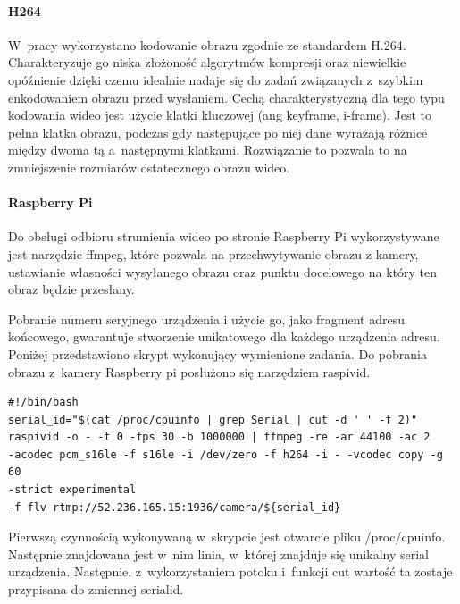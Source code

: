 \paragraph{H264}
W~pracy wykorzystano kodowanie obrazu zgodnie ze standardem H.264. Charakteryzuje go niska złożoność algorytmów kompresji oraz niewielkie opóźnienie dzięki czemu idealnie nadaje się do zadań związanych z~szybkim enkodowaniem obrazu przed wysłaniem. \cite{H264}
Cechą charakterystyczną dla tego typu kodowania wideo jest użycie klatki kluczowej (ang keyframe, i-frame). Jest to pełna klatka obrazu, podczas gdy następujące po niej dane wyrażają różnice między dwoma tą a~następnymi klatkami. Rozwiązanie to pozwala to na zmniejszenie rozmiarów ostatecznego obrazu wideo.

\paragraph{Raspberry Pi}
Do obsługi odbioru strumienia wideo po stronie Raspberry Pi wykorzystywane jest narzędzie ffmpeg, które pozwala na przechwytywanie obrazu z kamery, ustawianie własności wysyłanego obrazu oraz punktu docelowego na który ten obraz będzie przesłany.

Pobranie numeru seryjnego urządzenia i użycie go, jako fragment adresu końcowego, gwarantuje stworzenie unikatowego dla każdego urządzenia adresu. Poniżej przedstawiono skrypt wykonujący wymienione zadania. Do pobrania obrazu z~kamery Raspberry pi posłużono się narzędziem raspivid. \cite{raspivid}
\begin{verbatim}
#!/bin/bash
serial_id="$(cat /proc/cpuinfo | grep Serial | cut -d ' ' -f 2)"
raspivid -o - -t 0 -fps 30 -b 1000000 | ffmpeg -re -ar 44100 -ac 2 
-acodec pcm_s16le -f s16le -i /dev/zero -f h264 -i - -vcodec copy -g 60 
-strict experimental 
-f flv rtmp://52.236.165.15:1936/camera/${serial_id}
\end{verbatim}
Pierwszą czynnością wykonywaną w~skrypcie jest otwarcie pliku /proc/cpuinfo. Następnie znajdowana jest w~nim linia, w~której znajduje się unikalny serial urządzenia. Następnie, z~wykorzystaniem potoku i~funkcji cut wartość ta zostaje przypisana do zmiennej serialid.

